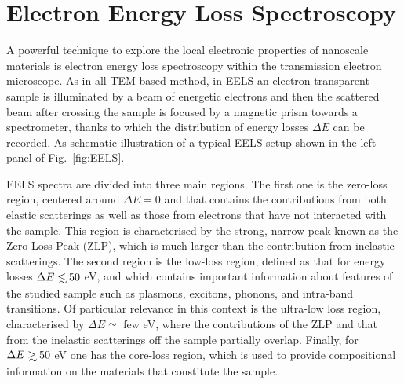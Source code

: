\section{Electron Energy Loss Spectroscopy}
\label{sec:eels}

A powerful technique to explore the local electronic properties
of nanoscale materials is electron energy loss spectroscopy 
within the transmission electron microscope.
%
As in all TEM-based method, in EELS an electron-transparent sample is illuminated by a 
beam of energetic electrons and then the scattered beam after crossing
the sample is focused by a magnetic prism
towards a spectrometer, thanks to which the distribution of energy losses $\Delta E$ can be recorded.
%
As schematic illustration of a typical EELS setup shown in the left panel of Fig.~\ref{fig:EELS}.

EELS spectra are divided into three main regions.
%
The first one is the zero-loss region, centered around $\Delta E=0$
and that contains the contributions from both elastic scatterings
as well as those from electrons that have not interacted with the
sample.
%
This region is characterised by the strong, narrow peak known as
the Zero Loss Peak (ZLP), which is much larger than the contribution
from inelastic scatterings.
%
The second region is the low-loss region, defined as that for energy losses
$\Delta E \lsim 50$ eV, and which contains important information
about features of the studied sample such as plasmons, excitons, phonons, and
intra-band transitions.
%
Of particular relevance in this context is the ultra-low loss region, characterised by $\Delta E \simeq$ few eV,
where the contributions of the ZLP and that from the inelastic scatterings
off the sample partially overlap.
%
Finally, for $\Delta E \gsim 50$ eV one has the core-loss region,
which is used to provide compositional information
on the materials that constitute the sample.
 
